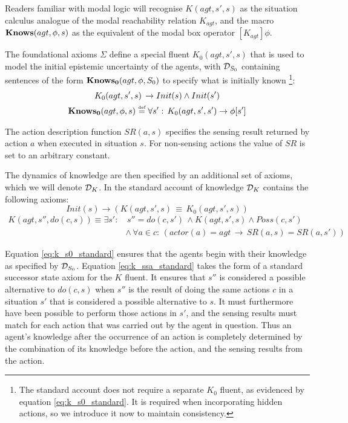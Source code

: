Readers familiar with modal logic will recognise $K(agt,s',s)$ as
the situation calculus analogue of the modal reachability relation
$K_{agt}$, and the macro $\mathbf{Knows}(agt,\phi,s)$ as the equivalent
of the modal box operator $[K_{agt}]\phi$.

The foundational axioms $\Sigma$ define a special fluent $K_{0}(agt,s',s)$
that is used to model the initial epistemic uncertainty of the agents,
with $\mathcal{D}_{S_{0}}$ containing sentences of the form $\mathbf{Knows_{0}}(agt,\phi,S_{0})$
to specify what is initially known%
\footnote{The standard account does not require a separate $K_{0}$ fluent,
as evidenced by equation \eqref{eq:k_s0_standard}. It is required
when incorporating hidden actions, so we introduce it now to maintain
consistency. %
}:\begin{gather*}
K_{0}(agt,s',s)\,\rightarrow Init(s)\wedge Init(s')\\
\mathbf{Knows_{0}}(agt,\phi,s)\stackrel{\mbox{\tiny def}}{=}\forall s':\, K_{0}(agt,s',s')\rightarrow\phi[s']\end{gather*}


The action description function $SR(a,s)$ specifies the sensing result
returned by action $a$ when executed in situation $s$. For non-sensing
actions the value of $SR$ is set to an arbitrary constant.

The dynamics of knowledge are then specified by an additional set
of axioms, which we will denote $\mathcal{D}_{K}$. In the standard account
of knowledge $\mathcal{D}_{K}$ contains the following axioms:\begin{equation}
Init(s)\rightarrow\left(K(agt,s',s)\,\equiv\, K_{0}(agt,s',s)\right)\label{eq:k_s0_standard}\end{equation}
 \begin{align}
K(agt,s'',do(c,s))\equiv\exists s': & \, s''=do(c,s')\,\wedge K(agt,s',s)\wedge Poss(c,s')\nonumber \\
 & \wedge\,\forall a\in c:\,\left(actor(a)=agt\,\rightarrow\, SR(a,s)=SR(a,s')\right)\label{eq:k_ssa_standard}\end{align}


Equation \eqref{eq:k_s0_standard} ensures that the agents begin with
their knowledge as specified by $\mathcal{D}_{S_{0}}$. Equation \eqref{eq:k_ssa_standard}
takes the form of a standard successor state axiom for the $K$ fluent.
It ensures that $s''$ is considered a possible alternative to $do(c,s)$
when $s''$ is the result of doing the same actions $c$ in a situation
$s'$ that is considered a possible alternative to $s$. It must furthermore
have been possible to perform those actions in $s'$, and the sensing
results must match for each action that was carried out by the agent
in question. Thus an agent's knowledge after the occurrence of an
action is completely determined by the combination of its knowledge
before the action, and the sensing results from the action.

